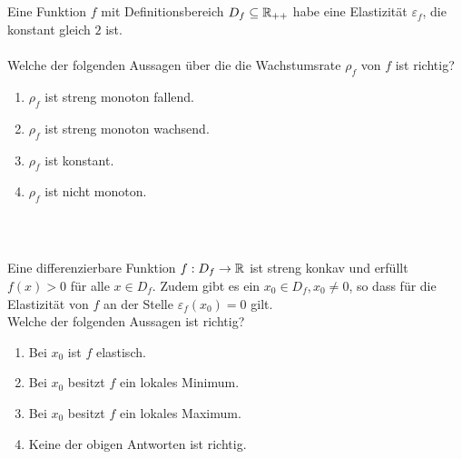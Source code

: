 \subsection*{}
Eine Funktion $ f $ mit Definitionsbereich $ D_f \subseteq \mathbb{R}_{++} $ habe eine Elastizität $ \varepsilon_f $, die konstant gleich $ 2 $ ist.\\
\\
Welche der folgenden Aussagen über die die Wachstumsrate $ \rho_f $ von $ f $ ist richtig?
\renewcommand{\labelenumi}{(\alph{enumi})}
\begin{enumerate}
\item 
$ \rho_f $ ist streng monoton fallend.
\item
$ \rho_f $ ist streng monoton wachsend.
\item
$ \rho_f $ ist konstant.
\item
$ \rho_f $ ist nicht monoton.
\end{enumerate}
\ \\
\subsection*{}
Eine differenzierbare Funktion $ f : D_f \to \mathbb{R}  $ ist streng konkav und erfüllt $ f(x)  > 0 $ für alle $ x \in D_f $.
Zudem gibt es ein $ x_0 \in D_f, x_0 \neq 0 $, so dass für die Elastizität von $ f $ an der Stelle $ \varepsilon_f(x_0 ) = 0 $ gilt.\\
Welche der folgenden Aussagen ist richtig?
\renewcommand{\labelenumi}{(\alph{enumi})}
\begin{enumerate}
	\item 
	Bei $ x_0 $ ist $ f $ elastisch.
	\item
	Bei $ x_0 $ besitzt $ f $ ein lokales Minimum.
	
	
	\item
	Bei $ x_0 $ besitzt $ f $ ein lokales Maximum.
	\item
	Keine der obigen Antworten ist richtig.
\end{enumerate}
\ \\
